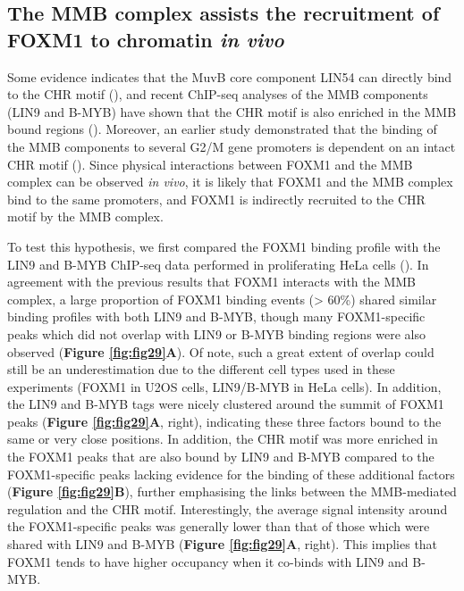\subsection{The MMB complex assists the recruitment of FOXM1 to chromatin \textit{in vivo}}

Some evidence indicates that the MuvB core component LIN54 can directly bind to the CHR motif (\cite{schmit2009lin54}), and recent ChIP-seq analyses of the MMB components (LIN9 and B-MYB) have shown that the CHR motif is also enriched in the MMB bound regions (\cite{sadasivam2012the}). Moreover, an earlier study demonstrated that the binding of the MMB components to several G2/M gene promoters is dependent on an intact CHR motif (\cite{müller2012the}). Since physical interactions between FOXM1 and the MMB complex can be observed \textit{in vivo}, it is likely that FOXM1 and the MMB complex bind to the same promoters, and FOXM1 is indirectly recruited to the CHR motif by the MMB complex.

To test this hypothesis, we first compared the FOXM1 binding profile with the LIN9 and B-MYB ChIP-seq data performed in proliferating HeLa cells (\cite{sadasivam2012the}). In agreement with the previous results that FOXM1 interacts with the MMB complex, a large proportion of FOXM1 binding events (> 60\%) shared similar binding profiles with both LIN9 and B-MYB, though many FOXM1-specific peaks which did not overlap with LIN9 or B-MYB binding regions were also observed (\textbf{Figure \ref{fig:fig29}A}). Of note, such a great extent of overlap could still be an underestimation due to the different cell types used in these experiments (FOXM1 in U2OS cells, LIN9/B-MYB in HeLa cells). In addition, the LIN9 and B-MYB tags were nicely clustered around the summit of FOXM1 peaks (\textbf{Figure \ref{fig:fig29}A}, right), indicating these three factors bound to the same or very close positions. In addition, the CHR motif was more enriched in the FOXM1 peaks that are also bound by LIN9 and B-MYB compared to the FOXM1-specific peaks lacking evidence for the binding of these additional factors (\textbf{Figure \ref{fig:fig29}B}), further emphasising the links between the MMB-mediated regulation and the CHR motif. Interestingly, the average signal intensity around the FOXM1-specific peaks was generally lower than that of those which were shared with LIN9 and B-MYB (\textbf{Figure \ref{fig:fig29}A}, right). This implies that FOXM1 tends to have higher occupancy when it co-binds with LIN9 and B-MYB.

